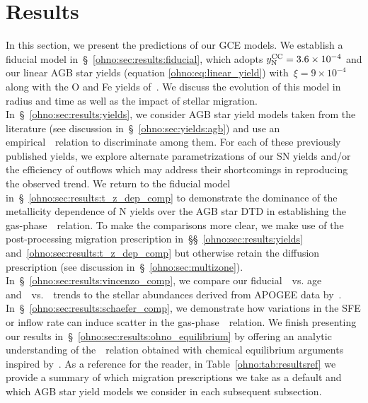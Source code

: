 
\section{Results}
\label{ohno:sec:results}

In this section, we present the predictions of our GCE models.
We establish a fiducial model in~\S~\ref{ohno:sec:results:fiducial}, which adopts
$y_\text{N}^\text{CC} = 3.6\times10^{-4}$ and our linear AGB star yields (equation
\ref{ohno:eq:linear_yield}) with~$\xi = 9\times10^{-4}$ along with the O and Fe
yields of~\citet[see discussion in~\S~\ref{ohno:sec:yields}]{Johnson2021}.
We discuss the evolution of this model in radius and time as well as the impact
of stellar migration.
In~\S~\ref{ohno:sec:results:yields}, we consider AGB star yield models taken from
the literature (see discussion in~\S~\ref{ohno:sec:yields:agb}) and use an
empirical~\ohno~relation to discriminate among them.
For each of these previously published yields, we explore alternate
parametrizations of our SN yields and/or the efficiency of outflows which may
address their shortcomings in reproducing the observed trend.
We return to the fiducial model in~\S~\ref{ohno:sec:results:t_z_dep_comp} to
demonstrate the dominance of the metallicity dependence of N yields over the
AGB star DTD in establishing the gas-phase~\ohno~relation.
To make the comparisons more clear, we make use of the post-processing
migration prescription in~\S\S~\ref{ohno:sec:results:yields}
and~\ref{ohno:sec:results:t_z_dep_comp} but otherwise retain the diffusion
prescription (see discussion in~\S~\ref{ohno:sec:multizone}).
In~\S~\ref{ohno:sec:results:vincenzo_comp}, we compare our fiducial~\no~vs. age
and~\no~vs.~\ofe~trends to the stellar abundances derived from APOGEE data
by~\citet{Vincenzo2021b}.
In~\S~\ref{ohno:sec:results:schaefer_comp}, we demonstrate how variations in the
SFE or inflow rate can induce scatter in the gas-phase~\ohno~relation.
We finish presenting our results in~\S~\ref{ohno:sec:results:ohno_equilibrium} by
offering an analytic understanding of the~\ohno~relation obtained with
chemical equilibrium arguments inspired by~\citet{Weinberg2017b}.
As a reference for the reader, in Table~\ref{ohno:tab:resultsref} we provide a
summary of which migration prescriptions we take as a default and which AGB
star yield models we consider in each subsequent subsection.

